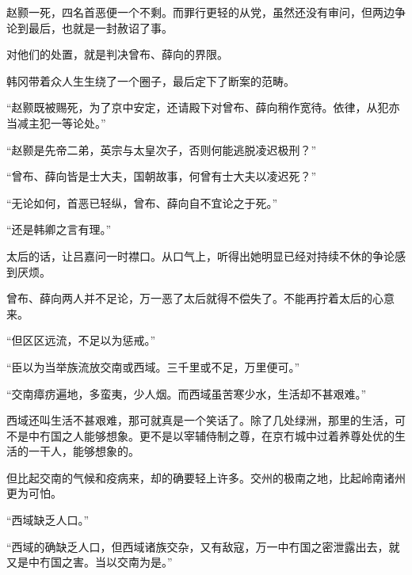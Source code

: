 赵颢一死，四名首恶便一个不剩。而罪行更轻的从党，虽然还没有审问，但两边争论到最后，也就是一封赦诏了事。

对他们的处置，就是判决曾布、薛向的界限。

韩冈带着众人生生绕了一个圈子，最后定下了断案的范畴。

“赵颢既被赐死，为了京中安定，还请殿下对曾布、薛向稍作宽待。依律，从犯亦当减主犯一等论处。”

“赵颢是先帝二弟，英宗与太皇次子，否则何能逃脱凌迟极刑？”

“曾布、薛向皆是士大夫，国朝故事，何曾有士大夫以凌迟死？”

“无论如何，首恶已轻纵，曾布、薛向自不宜论之于死。”

“还是韩卿之言有理。”

太后的话，让吕嘉问一时襟口。从口气上，听得出她明显已经对持续不休的争论感到厌烦。

曾布、薛向两人并不足论，万一恶了太后就得不偿失了。不能再拧着太后的心意来。

“但区区远流，不足以为惩戒。”

“臣以为当举族流放交南或西域。三千里或不足，万里便可。”

“交南瘴疠遍地，多蛮夷，少人烟。而西域虽苦寒少水，生活却不甚艰难。”

西域还叫生活不甚艰难，那可就真是一个笑话了。除了几处绿洲，那里的生活，可不是中冇国之人能够想象。更不是以宰辅侍制之尊，在京冇城中过着养尊处优的生活的一干人，能够想象的。

但比起交南的气候和疫病来，却的确要轻上许多。交州的极南之地，比起岭南诸州更为可怕。

“西域缺乏人口。”

“西域的确缺乏人口，但西域诸族交杂，又有敌寇，万一中冇国之密泄露出去，就又是中冇国之害。当以交南为是。”


